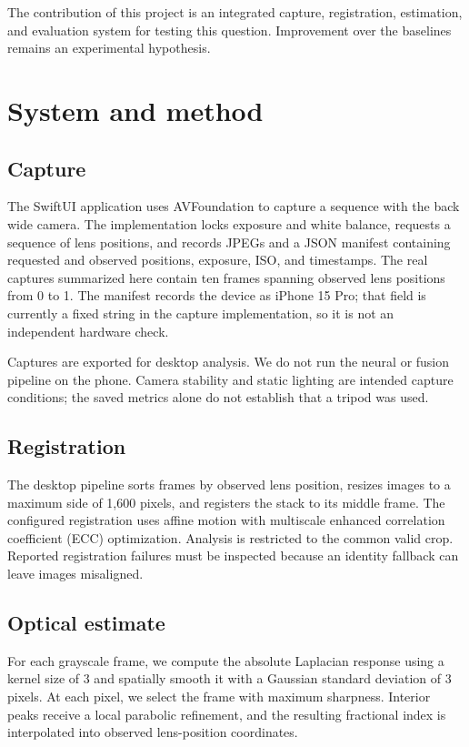 \documentclass[11pt]{article}
\begin{document}
The contribution of this project is an integrated capture, registration, estimation, and evaluation system for testing this question. Improvement over the baselines remains an experimental hypothesis.

\section{System and method}

\subsection{Capture}

The SwiftUI application uses AVFoundation to capture a sequence with the back wide camera. The implementation locks exposure and white balance, requests a sequence of lens positions, and records JPEGs and a JSON manifest containing requested and observed positions, exposure, ISO, and timestamps. The real captures summarized here contain ten frames spanning observed lens positions from 0 to 1. The manifest records the device as iPhone 15 Pro; that field is currently a fixed string in the capture implementation, so it is not an independent hardware check.

Captures are exported for desktop analysis. We do not run the neural or fusion pipeline on the phone. Camera stability and static lighting are intended capture conditions; the saved metrics alone do not establish that a tripod was used.

\subsection{Registration}

The desktop pipeline sorts frames by observed lens position, resizes images to a maximum side of 1,600 pixels, and registers the stack to its middle frame. The configured registration uses affine motion with multiscale enhanced correlation coefficient (ECC) optimization. Analysis is restricted to the common valid crop. Reported registration failures must be inspected because an identity fallback can leave images misaligned.

\subsection{Optical estimate}

For each grayscale frame, we compute the absolute Laplacian response using a kernel size of 3 and spatially smooth it with a Gaussian standard deviation of 3 pixels. At each pixel, we select the frame with maximum sharpness. Interior peaks receive a local parabolic refinement, and the resulting fractional index is interpolated into observed lens-position coordinates.
\end{document}
